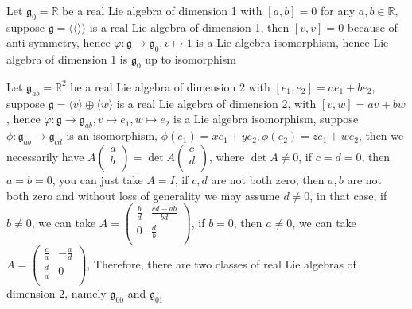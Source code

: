 \documentclass[main]{subfiles}
\newcommand{\<}[1]{\langle #1 \rangle}
\begin{document}
\begin{exercise}
\begin{enumerate}[label=(\alph*),leftmargin=*]

\end{enumerate}
\end{exercise}

\begin{solution}
Let $\mathfrak{g}_0=\mathbb{R}$ be a real Lie algebra of dimension 1 with $[a,b]=0$ for any $a,b\in\mathbb{R}$, suppose $\mathfrak{g}=\langle \langle\rangle\rangle$ is a real Lie algebra of dimension 1, then $[v,v]=0$ because of anti-symmetry, hence $\varphi:\mathfrak{g}\rightarrow\mathfrak{g}_0,v\mapsto 1$ is a Lie algebra isomorphism, hence Lie algebra of dimension 1 is $\mathfrak{g}_0$ up to isomorphism \par
Let $\mathfrak{g}_{ab}=\mathbb{R}^2$ be a real Lie algebra of dimension 2 with $[e_1,e_2]=ae_1+be_2$, suppose $\mathfrak{g}=\langle v\rangle\oplus\langle w\rangle$ is a real Lie algebra of dimension 2, with $[v,w]=av+bw$, hence $\varphi:\mathfrak{g}\rightarrow\mathfrak{g}_{ab},v\mapsto e_1,w\mapsto e_2$ is a Lie algebra isomorphism, suppose $\phi:\mathfrak{g}_{ab}\rightarrow\mathfrak{g}_{cd}$ is an isomorphism, $\phi(e_1)=xe_1+ye_2, \phi(e_2)=ze_1+we_2$, then we necessarily have $A\left( {\begin{array}{c}
a \\
b \\
\end{array} } \right)=\det A \left( {\begin{array}{c}
c \\
d \\
\end{array} } \right)$, where $\det A\neq0$, if $c=d=0$, then $a=b=0$, you can just take $A=I$, if $c,d$ are not both zero, then $a,b$ are not both zero and without loss of generality we may assume $d\neq0$, in that case, if $b\neq0$, we can take $A=\left( {\begin{array}{cc}
\frac{b}{d} & \frac{cd-ab}{bd} \\
0 & \frac{d}{b} \\
\end{array} } \right)$, if $b=0$, then $a\neq0$, we can take $A=\left( {\begin{array}{cc}
\frac{c}{a} & -\frac{a}{d} \\
\frac{d}{a} & 0 \\
\end{array} } \right)$, Therefore, there are two classes of real Lie algebras of dimension 2, namely $\mathfrak{g}_{00}$ and $\mathfrak{g}_{01}$
\end{solution}
\end{document}
